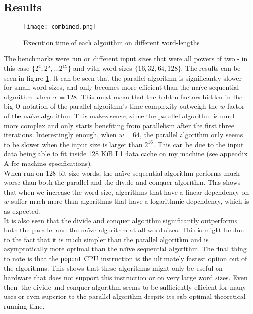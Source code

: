 \subsection{Results}
\begin{figure}
    \centering
    \texttt{[image: combined.png]}
    \caption{Execution time of each algorithm on different word-lengths}
    \label{fig:runningtime}
\end{figure}
The benchmarks were run on different input sizes that were all powers of two - in this case $\{2^4, 2^5, \dots 2^{19}\}$ and with word sizes $\{16, 32, 64, 128\}$. The results can be seen in figure \ref{fig:runningtime}. 
It can be seen that the parallel algorithm is significantly slower for small word sizes, and only becomes more efficient than the naïve sequential algorithm when $w=128$. This must mean that the hidden factors hidden in the big-O notation of the parallel algorithm's time complexity outweigh the $w$ factor of the naïve algorithm. This makes sense, since the parallel algorithm is much more complex and only starts benefiting from parallelism after the first three iterations. Interestingly enough, when $w=64$, the parallel algorithm only seems to be slower when the input size is larger than $2^{16}$. This can be due to the input data being able to fit inside 128 KiB L1 data cache on my machine (see appendix A for machine specifications).\\
When run on 128-bit size words, the naïve sequential algorithm performs much worse than both the parallel and the divide-and-conquer algorithm. This shows that when we increase the word size, algorithms that have a linear dependency on $w$ suffer much more than algorithms that have a logarithmic dependency, which is as expected.\\
It is also seen that the divide and conquer algorithm significantly outperforms both the parallel and the naïve algorithm at all word sizes. This is might be due to the fact that it is much simpler than the parallel algorithm and is asymptotically more optimal than the naïve sequential algorithm.
The final thing to note is that the \texttt{popcnt} CPU instruction is the ultimately fastest option out of the algorithms. This shows that these algorithms might only be useful on hardware that does not support this instruction or on very large word sizes. Even then, the divide-and-conquer algorithm seems to be sufficiently efficient for many uses or even superior to the parallel algorithm despite its sub-optimal theoretical running time.\\

